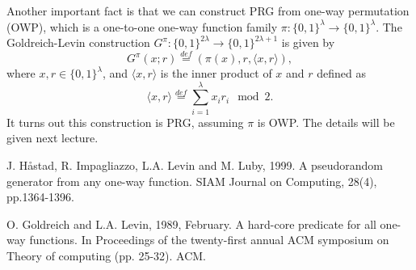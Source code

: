 \documentclass[12pt]{article}
\newcommand{\eqdef}{\stackrel{def}{=}}
\newcommand{\bits}{\{0,1\}}
\newcommand{\angles}[1]{\langle #1 \rangle}
\theoremstyle{definition}
\begin{document}
Another important fact is that we can construct PRG from one-way permutation (OWP), which is a one-to-one one-way function family $\pi: \bits^\lambda \to \bits^\lambda$. The Goldreich-Levin construction \cite{GL89} $G^\pi : \bits^{2\lambda} \to \bits^{2\lambda+1}$ is given by
$$G^\pi(x; r) \eqdef (\pi(x), r, \angles{x,r}),$$
where $x, r\in\bits^\lambda$, and $\angles{x,r}$ is the inner product of $x$ and $r$ defined as
$$\angles{x,r} \eqdef \sum_{i=1}^\lambda x_ir_i \mod 2.$$
It turns out this construction is PRG, assuming $\pi$ is OWP. 
The details will be given next lecture.

\begin{thebibliography}{10}
J. H\aa stad, R. Impagliazzo, L.A. Levin and M. Luby, 1999. 
A pseudorandom generator from any one-way function. 
SIAM Journal on Computing, 28(4), pp.1364-1396.
	
O. Goldreich and L.A. Levin, 1989, February. 
A hard-core predicate for all one-way functions. 
In Proceedings of the twenty-first annual ACM symposium on Theory of computing (pp. 25-32). ACM.
\end{thebibliography}
\end{document}
